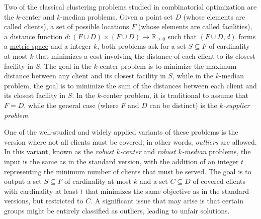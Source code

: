\documentclass[12pt]{article}
\begin{document}
Two of the classical clustering problems studied in combinatorial optimization are the $k$-center and $k$-median problems. 
Given a point set $D$ (whose elements are called clients), a set of possible locations $F$ (whose elements are called facilities), a distance function $d : (F \cup D) \times (F \cup D) \rightarrow \mathbb{R}_{\geq 0}$ such that $(F\cup D, d)$ forms a \href{https://en.wikipedia.org/wiki/Metric_space}{metric space} and a integer $k$, both problems ask for a set $S \subseteq F$ of cardinality at most $k$ that minimizes a cost involving the distance of each client to its closest facility in $S$.
The goal in the $k$-center problem is to minimize the maximum distance between any client and its closest facility in $S$, while in the $k$-median problem, the goal is to minimize the sum of the distances between each client and its closest facility in $S$.
In the $k$-center problem, it is traditional to assume that $F=D$, while the general case (where $F$ and $D$ can be distinct) is the \emph{$k$-supplier problem}.

One of the well-studied and widely applied variants of these problems is the version where not all clients must be covered; in other words, \emph{outliers} are allowed. 
In this variant, known as the \emph{robust $k$-center} and \emph{robust $k$-median} problems, the input is the same as in the standard version, with the addition of an integer $t$ representing the minimum number of clients that must be served. 
The goal is to output a set $S \subseteq F$ of cardinality at most $k$ and a set $C \subseteq D$ of covered clients with cardinality at least $t$ that minimizes the same objective as in the standard versions, but restricted to $C$. A significant issue that may arise is that certain groups might be entirely classified as outliers, leading to unfair solutions.
\end{document}
